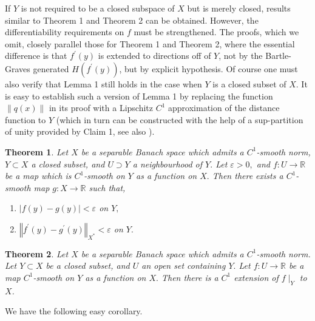 \documentclass[11pt]{amsproc}%
\theoremstyle{plain}
\newtheorem{theorem}{Theorem}
\numberwithin{equation}{section}
\begin{document}
\medskip

If $Y$ is not required to be a closed subspace of $X$ but is
merely closed, results similar to Theorem 1 and Theorem 2 can be
obtained. However, the differentiability requirements on $f$ must
be strengthened. The proofs, which we omit, closely parallel those
for Theorem 1 and Theorem 2, where the essential difference is
that $f^{\prime}(y)$ is extended to directions off of $Y$, not by
the Bartle-Graves generated $H(f^{\prime}(y))$, but by explicit
hypothesis. Of course one must also verify that Lemma 1 still
holds in the case when $Y$ is a closed subset of $X$. It is easy
to establish such a version of Lemma 1 by replacing the function
$\|q(x)\|$ in its proof with a Lipschitz $C^1$ approximation of
the distance function to $Y$ (which in turn can be constructed
with the help of a sup-partition of unity provided by Claim 1, see
also \cite{F, HJ}).



\medskip

\begin{theorem}
\label{Key}Let $X$ be a separable Banach space which admits a $C^{1}$-smooth
norm, $Y\subset X$ a closed subset, and $U\supset Y$ a neighbourhood of $Y.$
Let $\varepsilon>0,$ and $f:U\rightarrow\mathbb{R}$ be a map which is $C^{1}%
$-smooth on $Y$ as a function on $X.$ Then there exists a $C^{1}$-smooth map
$g:X\rightarrow\mathbb{R}$ such that,

\begin{enumerate}
\item $\left\vert f\left(  y\right)  -g\left(  y\right)  \right\vert
<\varepsilon$ on $Y,$

\smallskip

\item $\left\Vert f^{\prime}\left(  y\right)  -g^{\prime}\left(  y\right)
\right\Vert _{X^{\ast}}<\varepsilon$ on $Y.$
\end{enumerate}
\end{theorem}

\medskip

\begin{theorem}
\label{Mainresult} Let $X$ be a separable Banach space which admits a $C^{1}%
$-smooth norm. Let $Y\subset X$ be a closed subset, and $U$ an open set
containing $Y.$ Let $f:U\rightarrow\mathbb{R}$ be a map $C^{1}$-smooth on $Y$
as a function on $X.$ Then there is a $C^{1}$ extension of $f\mid_{Y}$ to $X$.
\end{theorem}

\noindent We have the following easy corollary.
\end{document}
